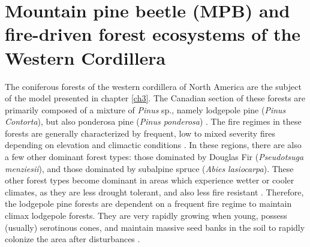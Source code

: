 \section{Mountain pine beetle (MPB) and fire-driven forest ecosystems of the Western Cordillera}


The coniferous forests of the western cordillera of North America are the subject of the model presented in chapter \ref{ch3}. The Canadian section of these forests are primarily composed of a mixture of \textit {Pinus} sp., namely lodgepole pine (\textit{Pinus Contorta}), but also ponderosa pine (\textit{Pinus ponderosa}) \cite{brown2010impact}. The fire regimes in these forests are generally characterized by frequent, low to mixed severity fires depending on elevation and climactic conditions \cite{agee1996fire,arno1980forest}. In these regions, there are also a few other dominant forest types: those dominated by Douglas Fir (\textit{Pseudotsuga menziesii}), and those dominated by subalpine spruce (\textit{Abies lasiocarpa}). These other forest types become dominant in areas which experience wetter or cooler climates, as they are less drought tolerant, and also less fire resistant \cite{JENKINS200816}. Therefore, the lodgepole pine forests are dependent on a frequent fire regime to maintain climax lodgepole forests. They are very rapidly growing when young, possess (usually) serotinous cones, and maintain massive seed banks in the soil to rapidly colonize the area after disturbances \cite{lotan1976cone,lotan1985role}.

